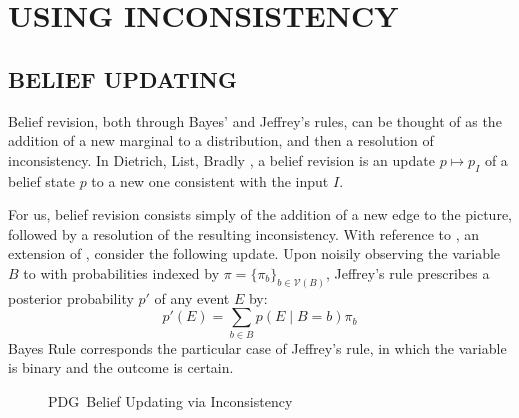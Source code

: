 \documentclass{article}
\def\sheq{\!=\!}
\newcommand{\V}{\mathcal V}
\newcommand{\MN}{PDG}
\numberwithin{equation}{section}
\begin{document}
	\section{USING INCONSISTENCY}	
	\subsection{BELIEF UPDATING} \label{sec:belief-update}
	Belief revision, both through Bayes' and Jeffrey's rules, can be thought of as the addition of a new marginal to a distribution, and then a resolution of inconsistency. In Dietrich, List, Bradly \cite{dietrich2016belief}, a belief revision is an update $p \mapsto p_I$ of a belief state $p$ to a new one consistent with the input $I$. 
	
	For us, belief revision consists simply of the addition of a new edge to the picture, followed by a resolution of the resulting inconsistency. 
	With reference to , an extension of , consider the following update. 
	Upon noisily observing the variable $B$ to with probabilities indexed by $\pi = \{\pi_b\}_{b \in \V(B)}$, Jeffrey's rule prescribes a posterior probability $p'$ of any event $E$ by:
	\[ p'(E) = \sum_{b \in B} p(E \mid B\sheq b) \pi_b \]
	Bayes Rule corresponds the particular case of Jeffrey's rule, in which the variable is binary and the outcome is certain.

	
	\begin{figure}[h]
		\centering
%				
%				
		\caption{\MN\ Belief Updating via Inconsistency}
		\label{fig:belief-update}
	\end{figure}
	
\end{document}
